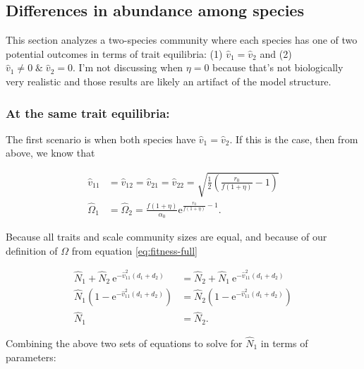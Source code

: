 \subsection*{Differences in abundance among species}



This section analyzes a two-species community where each species has one of two potential
outcomes in terms of trait equilibria:
(1) $\hat{v}_1 = \hat{v}_2$ and
(2) $\hat{v}_1 \ne 0 \; \& \; \hat{v}_2 = 0$.
I'm not discussing when $\eta = 0$ because that's not biologically very realistic
and those results are likely an artifact of the model structure.


\subsubsection*{At the same trait equilibria:}

The first scenario is when both species have $\hat{v}_1 = \hat{v}_2$.
If this is the case, then from above, we know that

\begin{equation*}
\begin{split}
    \hat{v}_{11} &= \hat{v}_{12} = \hat{v}_{21} = \hat{v}_{22} = \sqrt{\frac{1}{2}
        \left( \frac{r_0}{f (1 + \eta)} - 1 \right)} \\
    \hat\Omega_1 &= \hat\Omega_2 = \frac{f (1 + \eta)}{\alpha_0}
        \text{e}^{\frac{r_0}{f (1 + \eta)} - 1}
    \text{.}
\end{split}
\end{equation*}

Because all traits and scale community sizes are equal, and because of our
definition of $\Omega$ from equation \ref{eq:fitness-full}

\begin{equation} \label{eq:two-traits-v1-v2-equal-N1-N2}
\begin{split}
    \hat{N}_1 + \hat{N}_2 \: \text{e}^{-\hat{v}_{11}^2 (d_1 + d_2)} &=
        \hat{N}_2 + \hat{N}_1 \: \text{e}^{-\hat{v}_{11}^2 (d_1 + d_2)} \\
    \hat{N}_1 \left( 1 - \text{e}^{-\hat{v}_{11}^2 (d_1 + d_2)} \right) &=
        \hat{N}_2 \left( 1 - \text{e}^{-\hat{v}_{11}^2 (d_1 + d_2)} \right) \\
    \hat{N}_1 &= \hat{N}_2
    \text{.}
\end{split}
\end{equation}

\noindent Combining the above two sets of equations to solve for $\hat{N}_1$ in
terms of parameters:


